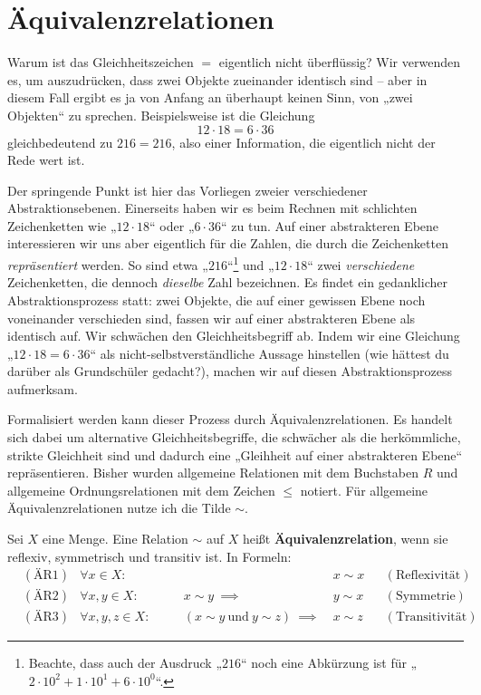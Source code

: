 \section{Äquivalenzrelationen}


\begin{bem} \label{aequirelphilo}
    Warum ist das Gleichheitszeichen $=$ eigentlich nicht überflüssig? Wir verwenden es, um auszudrücken, dass zwei Objekte zueinander identisch sind -- aber in diesem Fall ergibt es ja von Anfang an überhaupt keinen Sinn, von „zwei Objekten“ zu sprechen. Beispielsweise ist die Gleichung
        \[ 12\cdot 18 = 6\cdot 36 \]
    gleichbedeutend zu $216=216$, also einer Information, die eigentlich nicht der Rede wert ist.
    
    Der springende Punkt ist hier das Vorliegen zweier verschiedener Abstraktionsebenen. Einerseits haben wir es beim Rechnen mit schlichten Zeichenketten wie „$12\cdot 18$“ oder „$6\cdot 36$“ zu tun. Auf einer abstrakteren Ebene interessieren wir uns aber eigentlich für die Zahlen, die durch die Zeichenketten \emph{repräsentiert} werden. So sind etwa „$216$“\footnote{Beachte, dass auch der Ausdruck „$216$“ noch eine Abkürzung ist für „$2\cdot 10^2 + 1\cdot 10^1 + 6 \cdot 10^0$“.} und „$12\cdot 18$“ zwei \emph{verschiedene} Zeichenketten, die dennoch \emph{dieselbe} Zahl bezeichnen. Es findet ein gedanklicher Abstraktionsprozess statt: zwei Objekte, die auf einer gewissen Ebene noch voneinander verschieden sind, fassen wir auf einer abstrakteren Ebene als identisch auf. Wir schwächen den Gleichheitsbegriff ab. Indem wir eine Gleichung „$12\cdot 18=6\cdot 36$“ als nicht-selbstverständliche Aussage hinstellen (wie hättest du darüber als Grundschüler gedacht?), machen wir auf diesen Abstraktionsprozess aufmerksam.
    
    Formalisiert werden kann dieser Prozess durch Äquivalenzrelationen. Es handelt sich dabei um alternative Gleichheitsbegriffe, die schwächer als die herkömmliche, strikte Gleichheit sind und dadurch eine „Gleihheit auf einer abstrakteren Ebene“ repräsentieren. Bisher wurden allgemeine Relationen mit dem Buchstaben $R$ und allgemeine Ordnungsrelationen mit dem Zeichen $\le$ notiert. Für allgemeine Äquivalenzrelationen nutze ich die Tilde $\sim$.
\end{bem}


\begin{de} \label{def:aequirel} 
    Sei $X$ eine Menge. Eine Relation $\sim$ auf $X$ heißt \textbf{Äquivalenzrelation}, wenn sie reflexiv, symmetrisch und transitiv ist. In Formeln:
    \begin{align*}
        & (\text{ÄR1}) & \forall x\in X:&&\quad & x\sim x && (\text{Reflexivität}) \\
        & (\text{ÄR2}) & \forall x,y\in X:&&\quad x\sim y\ \implies\ & y\sim x && (\text{Symmetrie}) \\
    & (\text{ÄR3}) & \forall x,y,z\in X:&&\quad (x\sim y\ \text{und}\ y\sim z)\ \implies\ & x\sim z && (\text{Transitivität})
    \end{align*}
\end{de}


